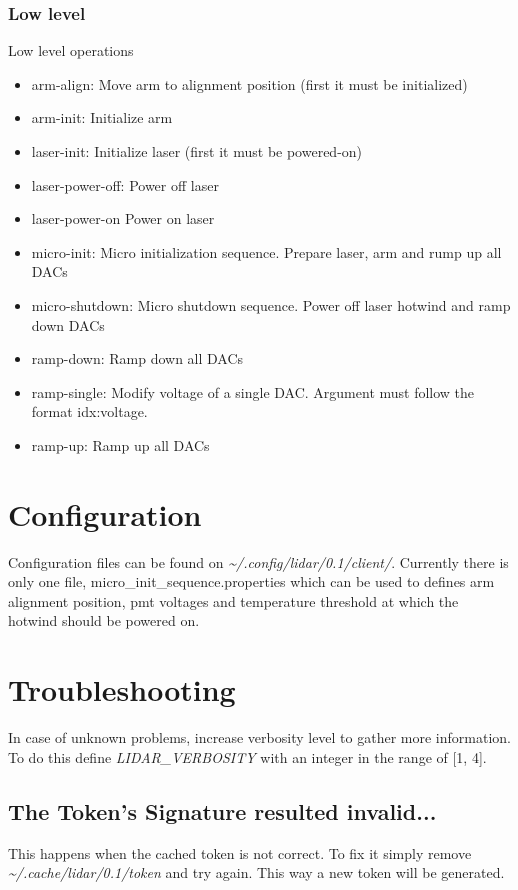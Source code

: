 \documentclass[letterpaper, 10 pt]{article}
\begin{document}
\subsubsection{Low level}
Low level operations
\begin{itemize}
	\item arm-align: Move arm to alignment position (first it must be initialized)
	\item arm-init: Initialize arm
	\item laser-init: Initialize laser (first it must be powered-on)
	\item laser-power-off: Power off laser
	\item laser-power-on Power on laser
	\item micro-init: Micro initialization sequence. Prepare laser, arm and rump up all DACs
	\item micro-shutdown: Micro shutdown sequence. Power off laser hotwind and ramp down DACs
	\item ramp-down: Ramp down all DACs
	\item ramp-single: Modify voltage of a single DAC. Argument must follow the format idx:voltage.
	\item ramp-up: Ramp up all DACs
\end{itemize}

\section{Configuration}
Configuration files can be found on \textit{\~{}/.config/lidar/0.1/client/}. Currently there is only one file, micro\_init\_sequence.properties which can be used to defines arm alignment position, pmt voltages and temperature threshold at which the hotwind should be powered on.

\section{Troubleshooting}
In case of unknown problems, increase verbosity level to gather more information. To do this define \emph{LIDAR\_VERBOSITY} with an integer in the range of [1, 4].
\subsection{The Token's Signature resulted invalid...}
This happens when the cached token is not correct. To fix it simply remove \textit{\~{}/.cache/lidar/0.1/token} and try again. This way a new token will be generated.\\
\end{document}
